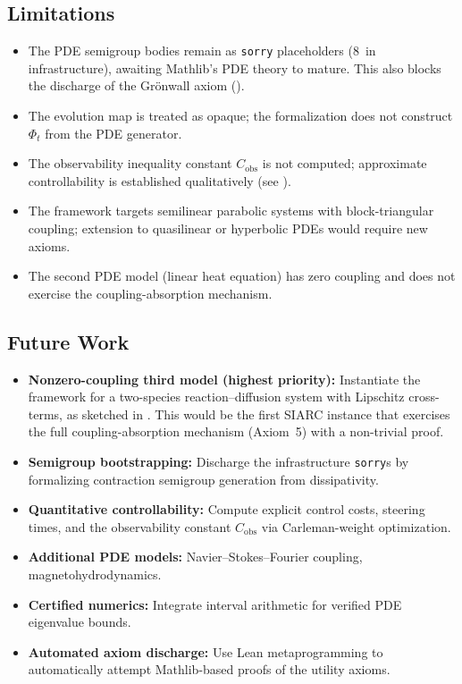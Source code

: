 \documentclass[11pt,a4paper]{article}
\theoremstyle{plain}
\theoremstyle{definition}
\theoremstyle{remark}
\newcommand{\sorry}{\texttt{sorry}}
\begin{document}
\subsection{Limitations}

\begin{itemize}
  \item The PDE semigroup bodies remain as \sorry{} placeholders
    (8~in infrastructure), awaiting Mathlib's PDE theory to mature.
    This also blocks the discharge of the Gr\"{o}nwall axiom
    ().
  \item The evolution map is treated as opaque; the formalization does
    not construct $\Phi_t$ from the PDE generator.
  \item The observability inequality constant $C_{\mathrm{obs}}$ is not
    computed; approximate controllability is established qualitatively
    (see ).
  \item The framework targets semilinear parabolic systems with
    block-triangular coupling;
    extension to quasilinear or hyperbolic PDEs would require new axioms.
  \item The second PDE model (linear heat equation) has zero coupling
    and does not exercise the coupling-absorption mechanism.
\end{itemize}

\subsection{Future Work}

\begin{itemize}
  \item \textbf{Nonzero-coupling third model (highest priority):}
    Instantiate the framework for a two-species reaction--diffusion
    system with Lipschitz cross-terms, as sketched in .
    This would be the first SIARC instance that exercises the full
    coupling-absorption mechanism (Axiom~5) with a non-trivial proof.
  \item \textbf{Semigroup bootstrapping:} Discharge the infrastructure
    \sorry{}s by formalizing contraction semigroup generation from
    dissipativity.
  \item \textbf{Quantitative controllability:} Compute explicit control
    costs, steering times, and the observability constant
    $C_{\mathrm{obs}}$ via Carleman-weight optimization.
  \item \textbf{Additional PDE models:} Navier--Stokes--Fourier
    coupling, magnetohydrodynamics.
  \item \textbf{Certified numerics:} Integrate interval arithmetic for
    verified PDE eigenvalue bounds.
  \item \textbf{Automated axiom discharge:} Use Lean metaprogramming to
    automatically attempt Mathlib-based proofs of the utility axioms.
\end{itemize}
\end{document}
